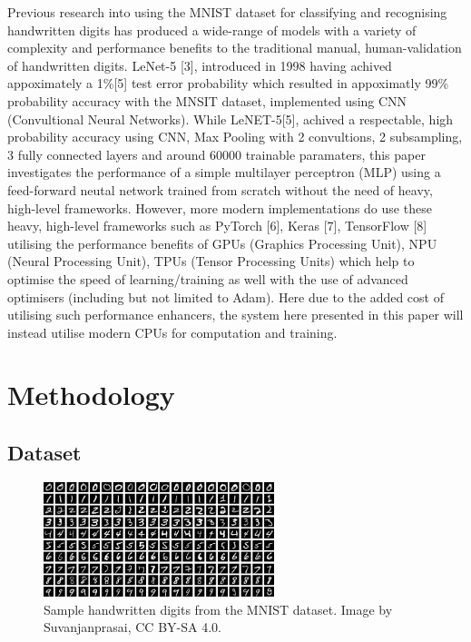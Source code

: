 \documentclass[11pt]{article}
\begin{document}
\vspace{1em}
Previous research into using the MNIST dataset for classifying and recognising handwritten digits has produced a wide-range of models with a variety of complexity and performance benefits to the traditional manual, human-validation of handwritten digits. LeNet-5 [3], introduced in 1998 having achived appoximately a 1\%[5] test error probability which resulted in appoximatly 99\% probability accuracy with the MNSIT dataset, implemented using CNN (Convultional Neural Networks). While LeNET-5[5], achived a respectable, high probability accuracy using CNN, Max Pooling with 2 convultions, 2 subsampling, 3 fully connected layers and around 60000 trainable paramaters, this paper investigates the performance of a simple multilayer perceptron (MLP) using a feed-forward neutal network trained from scratch without the need of heavy, high-level frameworks. However, more modern implementations do use these heavy, high-level frameworks such as PyTorch [6], Keras [7], TensorFlow [8] utilising the performance benefits of GPUs (Graphics Processing Unit), NPU (Neural Processing Unit), TPUs (Tensor Processing Units) which help to optimise the speed of learning/training as well with the use of advanced optimisers (including but not limited to Adam). Here due to the added cost of utilising such performance enhancers, the system here presented in this paper will instead utilise modern CPUs for computation and training.

\section{Methodology}
\subsection{Dataset}
\begin{figure}[H]
  \centering
  \includegraphics[width=0.6\textwidth]{MNIST_dataset_example.png}
  \caption{Sample handwritten digits from the MNIST dataset. Image by Suvanjanprasai, CC BY-SA 4.0.}
  \label{fig:mnist}
\end{figure}
\end{document}
